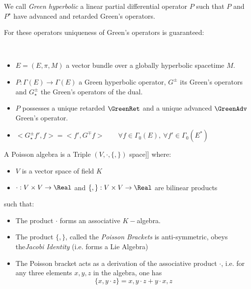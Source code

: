 \documentclass[a4paper,10pt,smallheadings]{scrartcl}
\begin{document}
			\begin{definition}
				We call \emph{Green hyperbolic} a
				linear partial differential operator $P$
				such that $P$ and $P^\star$ have advanced and retarded Green’s operators.
			\end{definition}
			For these operators uniqueness of Green's operators is guaranteed:
			\begin{theorem}\label{Teo:GreenHypCharacter}
				$ $
				\begin{hypothesis}
					\begin{itemize}
						\item $E=(E,\pi,M)$ a vector bundle over a globally hyperbolic spacetime $M$.
						\item $P:\Gamma(E) \rightarrow \Gamma(E)$ a Green hyperbolic operator, $G^\pm$ its Green's operators and $G_\star^\pm$ the Green's operators of the dual.
					\end{itemize}
				\end{hypothesis}
				\begin{thesis}
					\begin{itemize}
					\item $P$ possesses a unique retarded $\GreenRet$ and a unique advanced $\GreenAdv$ Green's operator.
					\item $<G_\star^\pm f', f> = <f', G^\mp f > \qquad \forall f \in \Gamma_0(E),\: \forall f' \in \Gamma_0(E^*)$
					\end{itemize}
				\end{thesis}
			\end{theorem}
	
\begin{definition}
A Poisson algebra is a Triple $\left(V, \cdot ,\{ , \} \right)$ space]]  where:
\begin{itemize}
	\item $V$ is a vector space of field $K$
	\item $ \cdot : V \times V \rightarrow \Real$  and $\{ , \} : V \times V \rightarrow \Real$ are bilinear products
\end{itemize}
such that:
\begin{itemize}
\item The product $ \cdot $ forms an  associative $K-$algebra.
\item The product $\{ , \}$, called the \emph{Poisson Brackets}  is anti-symmetric, obeys the\emph{Jacobi Identity} (i.e. forms a Lie Algebra)
\item The Poisson bracket acts as a derivation of the associative product $ \cdot $, i.e. for any three elements $x,y,z$ in the algebra, one has
\begin{displaymath}
	\{x, y \cdot z \} = { x , y } \cdot z + y \cdot { x , z }
\end{displaymath}
\end{itemize}
\end{definition}
				
\end{document}
